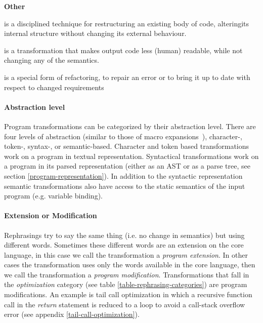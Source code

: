 \textbf{Other}

\begin{description}[font=\normalfont,align=right,leftmargin=!, labelwidth=\widthof{{\bfseries Specialization}},labelsep=2em]
	\item[Refactoring] is a disciplined technique for restructuring an existing body of code, alteringits internal structure without changing its external behaviour.\footnotemark   
	\item[Obfuscation] is a transformation that makes output code less (human) readable, while not changing any of the semantics.
	\item[Renovation] is a special form of refactoring, to repair an error or to bring it up to date with respect to changed requirements~\cite{Visser2001}
\end{description}

\paragraph{Abstraction level}
Program transformations can be categorized by their abstraction level. There are four levels of abstraction (similar to those of macro expansions~\cite{Weise1993}), character-, token-, syntax-, or semantic-based. Character and token based transformations work on a program in textual representation. Syntactical transformations work on a program in its parsed representation (either as an AST or as a parse tree, see section \ref{program-representation}). In addition to the syntactic representation semantic transformations also have access to the static semantics of the input program (e.g. variable binding).

\paragraph{Extension or Modification}
Rephrasings try to say the same thing (i.e. no change in semantics) but using different words\cite{Visser2001}. Sometimes these different words are an extension on the core language, in this case we call the transformation a \textit{program extension}. In other cases the transformation uses only the words available in the core language, then we call the transformation a \textit{program modification}. Transformations that fall in the \textit{optimization} category (see table \ref{table-rephrasing-categories}) are program modifications. An example is tail call optimization in which a recursive function call in the \textit{return} statement is reduced to a loop to avoid a call-stack overflow error (see appendix \ref{tail-call-optimization}).

